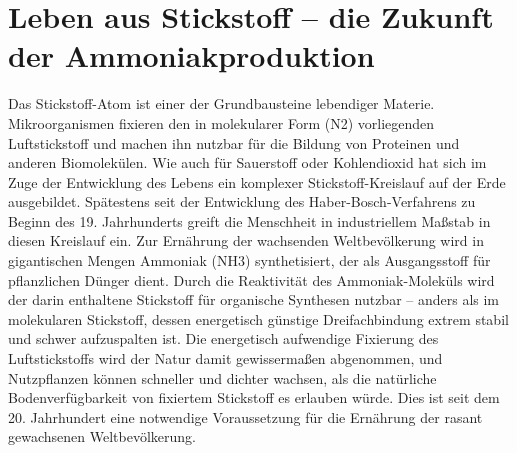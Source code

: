 \section{Leben aus Stickstoff – die Zukunft der Ammoniakproduktion}


\begin{multicols}{2}	
Das Stickstoff-Atom ist einer der Grundbausteine lebendiger Materie. Mikroorganismen fixieren den in molekularer Form (N2) vorliegenden Luftstickstoff und machen ihn nutzbar für die Bildung von Proteinen und anderen Biomolekülen. Wie auch für Sauerstoff oder Kohlendioxid hat sich im Zuge der Entwicklung des Lebens ein komplexer Stickstoff-Kreislauf auf der Erde ausgebildet. Spätestens seit der Entwicklung des Haber-Bosch-Verfahrens zu Beginn des 19. Jahrhunderts greift die Menschheit in industriellem Maßstab in diesen Kreislauf ein. Zur Ernährung der wachsenden Weltbevölkerung wird in gigantischen Mengen Ammoniak (NH3) synthetisiert, der als Ausgangsstoff für pflanzlichen Dünger dient. Durch die Reaktivität des Ammoniak-Moleküls wird der darin enthaltene Stickstoff für organische Synthesen nutzbar – anders als im molekularen Stickstoff, dessen energetisch günstige Dreifachbindung extrem stabil und schwer aufzuspalten ist. Die energetisch aufwendige Fixierung des Luftstickstoffs wird der Natur damit gewissermaßen abgenommen, und Nutzpflanzen können schneller und dichter wachsen, als die natürliche Bodenverfügbarkeit von fixiertem Stickstoff es erlauben würde. Dies ist seit dem 20. Jahrhundert eine notwendige Voraussetzung für die Ernährung der rasant gewachsenen Weltbevölkerung.
\\

\end{multicols}
